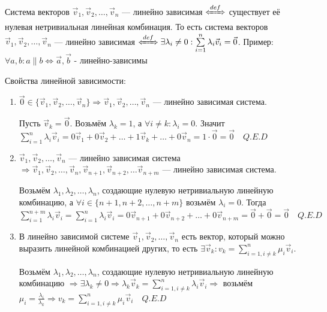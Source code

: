 Система векторов \(\vec v_1, \vec v_2, \dots, \vec v_n\) --- линейно зависимая \(\defLeftrightarrow\) существует её нулевая нетривиальная линейная комбинация. То есть система векторов \(\vec v_1, \vec v_2, \dots, \vec v_n\) --- линейно зависимая \(\defLeftrightarrow \exists \lambda_i \neq 0:\sum\limits_{i = 1}^{n} \lambda_i \vec v_i = \vec 0\). Пример: \(\forall a, b : a \parallel b\Leftrightarrow \vec a, \vec b\) - линейно-зависимы

Свойства линейной зависимости:
\begin{enumerate}
    \item \(\vec 0 \in \{\vec v_1, \vec v_2, \dots, \vec v_n\} \Rightarrow \vec v_1, \vec v_2, \dots, \vec v_n\) --- линейно зависимая система.

          Пусть \(\vec v_k = \vec 0\). Возьмём \(\lambda_k = 1\), а \(\forall i \neq k: \lambda_i = 0\). Значит \(\sum\limits_{i = 1}^{n} \lambda_i \vec v_i = 0 \vec v_1 + 0 \vec v_2 + \dots + 1 \vec v_k + \dots + 0 \vec v_n = 1 \cdot \vec 0 = \vec 0 \quad Q.E.D\)

    \item \(\vec v_1, \vec v_2, \dots, \vec v_n\) --- линейно зависимая система \(\Rightarrow \vec v_1, \vec v_2, \dots, \vec v_n, \vec v_{n + 1}, \vec v_{n + 2}, \dots \vec v_{n + m}\) --- линейно зависимая система.

          Возьмём \(\lambda_1, \lambda_2, \dots, \lambda_n\), создающие нулевую нетривиальную линейную комбинацию, а \(\forall i \in \{n + 1, n + 2, \dots, n + m\}\) возьмём \(\lambda_i = 0\). Тогда \(\sum\limits_{i = 1}^{n + m} \lambda_i \vec v_i = \sum\limits_{i = 1}^{n} \lambda_i \vec v_i = 0 \vec v_{n + 1} + 0 \vec v_{n + 2} + \dots + 0 \vec v_{n + m} = \vec 0 + \vec 0 = \vec 0 \quad Q.E.D\)\\

    \item В линейно зависимой системе \(\vec v_1, \vec v_2, \dots, \vec v_n\) есть вектор, который можно выразить линейной комбинацией других, то есть \(\exists \vec v_k: v_k = \sum\limits_{i = 1, i \neq k}^{n} \mu_i \vec v_i\).

          Возьмём \(\lambda_1, \lambda_2, \dots, \lambda_n\), создающие нулевую нетривиальную линейную комбинацию \(\Rightarrow \exists \lambda_k \neq 0 \Rightarrow \lambda_k \vec v_k = \sum\limits_{i = 1, i \neq k}^{n} \lambda_i \vec v_i \Rightarrow\) возьмём \(\mu_i = \frac{\lambda_i}{\lambda_k} \Rightarrow v_k = \sum\limits_{i = 1, i \neq k}^{n} \mu_i \vec v_i \quad Q.E.D\)

\end{enumerate}

